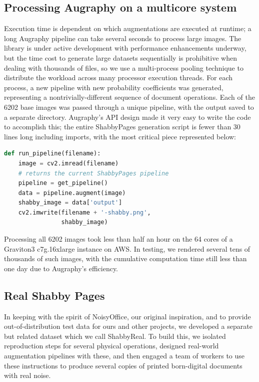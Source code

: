 \documentclass[runningheads]{llncs}
\begin{document}
\subsection{Processing Augraphy on a multicore system}
Execution time is dependent on which augmentations are executed at runtime; a long Augraphy pipeline can take several seconds to process large images.
The library is under active development with performance enhancements underway, but the time cost to generate large datasets sequentially is prohibitive when dealing with thousands of files, so we use a multi-process pooling technique to distribute the workload across many processor execution threads.
For each process, a new pipeline with new probability coefficients was generated, representing a nontrivially-different sequence of document operations.
Each of the 6202 base images was passed through a unique pipeline, with the output saved to a separate directory.
Augraphy's API design made it very easy to write the code to accomplish this; the entire ShabbyPages generation script is fewer than 30 lines long including imports, with the most critical piece represented below:

\begin{lstlisting}[language=Python]
  def run_pipeline(filename):
    image = cv2.imread(filename)
    # returns the current ShabbyPages pipeline
    pipeline = get_pipeline()
    data = pipeline.augment(image)
    shabby_image = data['output']
    cv2.imwrite(filename + '-shabby.png',
                shabby_image)
\end{lstlisting}

Processing all 6202 images took less than half an hour on the 64 cores of a Graviton3 c7g.16xlarge instance on AWS. In testing, we rendered several tens of thousands of such images, with the cumulative computation time still less than one day due to Augraphy's efficiency.

\subsection{Real Shabby Pages}
In keeping with the spirit of NoisyOffice, our original inspiration, and to provide out-of-distribution test data for ours and other projects, we developed a separate but related dataset which we call ShabbyReal. To build this, we isolated reproduction steps for several physical operations, designed real-world augmentation pipelines with these, and then engaged a team of workers to use these instructions to produce several copies of printed born-digital documents with real noise.
\end{document}
